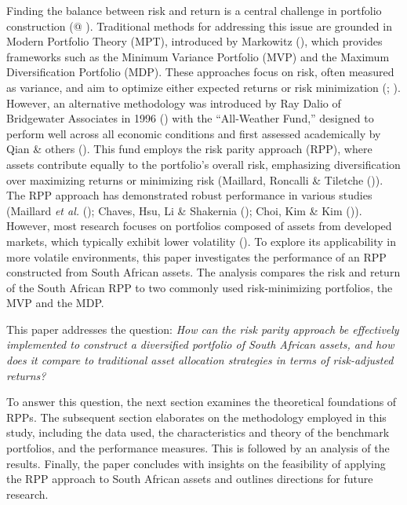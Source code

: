 \documentclass[11pt,preprint]{elsarticle}
\numberwithin{equation}{section}
\numberwithin{figure}{section}
\numberwithin{table}{section}
\begin{document}
Finding the balance between risk and return is a central challenge in
portfolio construction (@
).
Traditional methods for addressing this issue are grounded in Modern
Portfolio Theory (MPT), introduced by Markowitz
(), which
provides frameworks such as the Minimum Variance Portfolio (MVP) and the
Maximum Diversification Portfolio (MDP). These approaches focus on risk,
often measured as variance, and aim to optimize either expected returns
or risk minimization (; ). However, an alternative methodology was introduced by Ray Dalio
of Bridgewater Associates in 1996
() with the ``All-Weather Fund,''
designed to perform well across all economic conditions and first
assessed academically by Qian \& others
(). This fund employs the risk parity
approach (RPP), where assets contribute equally to the portfolio's
overall risk, emphasizing diversification over maximizing returns or
minimizing risk (Maillard, Roncalli \& Tiletche
()). The RPP approach has
demonstrated robust performance in various studies (Maillard \emph{et
al.} (); Chaves, Hsu, Li \&
Shakernia (); Choi, Kim \& Kim
()). However, most research
focuses on portfolios composed of assets from developed markets, which
typically exhibit lower volatility
(). To explore its applicability in more volatile
environments, this paper investigates the performance of an RPP
constructed from South African assets. The analysis compares the risk
and return of the South African RPP to two commonly used risk-minimizing
portfolios, the MVP and the MDP.

This paper addresses the question: \emph{How can the risk parity
approach be effectively implemented to construct a diversified portfolio
of South African assets, and how does it compare to traditional asset
allocation strategies in terms of risk-adjusted returns?}

To answer this question, the next section examines the theoretical
foundations of RPPs. The subsequent section elaborates on the
methodology employed in this study, including the data used, the
characteristics and theory of the benchmark portfolios, and the
performance measures. This is followed by an analysis of the results.
Finally, the paper concludes with insights on the feasibility of
applying the RPP approach to South African assets and outlines
directions for future research.
\end{document}

